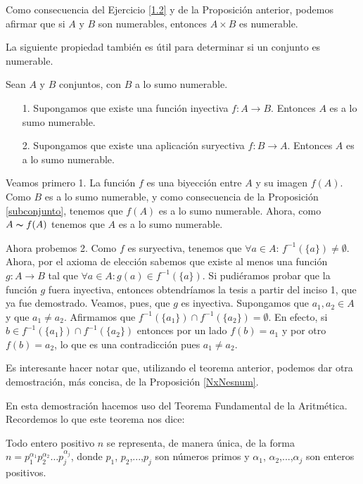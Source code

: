 Como consecuencia del Ejercicio \vref{1.2} y de la Proposición
anterior, podemos afirmar que si $A$ y $B$ son numerables,
entonces $A\times B$ es numerable.



La siguiente propiedad también es útil para determinar si un
conjunto es numerable.

\begin{proposicion}\label{numinysur}Sean $A$ y $B$ conjuntos, con $B$ a lo sumo
numerable.
\begin{itemize}
\item[1.] Supongamos que existe una función inyectiva $f:A\longrightarrow
B$. Entonces $A$ es a lo sumo numerable.
\item[2.] Supongamos que existe una aplicación suryectiva
$f:B\longrightarrow A$. Entonces $A$ es a lo sumo numerable.
\end{itemize}
\end{proposicion}
\begin{demo} Veamos primero 1. La función $f$ es  una biyección entre $A$ y su
imagen $f(A)$. Como $B$ es a lo sumo numerable,  y como
consecuencia de la Proposición \vref{subconjunto}, tenemos que
$f(A)$ es a lo sumo numerable. Ahora, como $A\thicksim f(A)$
tenemos que $A$ es a lo sumo numerable.

Ahora probemos 2. Como $f$ es suryectiva, tenemos que $\forall
a\in A$: $f^{-1}(\{a\})\neq\emptyset$. Ahora, por el axioma de
elección sabemos que existe al menos una función
$g:A\longrightarrow B$ tal que $\forall a\in A:g(a)\in
f^{-1}(\{a\})$. Si pudiéramos probar que la función $g$ fuera
inyectiva, entonces obtendríamos la tesis a partir del inciso
1, que ya fue demostrado. Veamos, pues, que $g$ es inyectiva.
Supongamos que $a_1,a_2\in A$ y que $a_1\neq a_2$. Afirmamos que
$f^{-1}(\{a_1\})\cap f^{-1}(\{a_2\})=\emptyset$. En efecto, si
$b\in f^{-1}(\{a_1\})\cap f^{-1}(\{a_2\})$ entonces por un lado
 $f(b)=a_1$ y por otro $f(b)=a_2$, lo que es una contradicción pues $a_1\neq a_2$.
\end{demo}

Es interesante hacer notar que, utilizando el teorema anterior,
podemos dar otra demostración, más concisa, de la
Proposición \vref{NxNesnum}.

En esta demostración hacemos uso del Teorema Fundamental de la
Aritmética. Recordemos lo que este teorema nos dice:


\begin{teorema} Todo entero positivo $n$ se representa, de
manera única, de la forma $n=p_1^{\alpha_1}p_2^{\alpha_2}\dots
p_j^{\alpha_j}$, donde $p_1$, $p_2$,...,$p_j$ son números primos
y $\alpha_1$, $\alpha_2$,...,$\alpha_j$ son enteros positivos.
\end{teorema}

